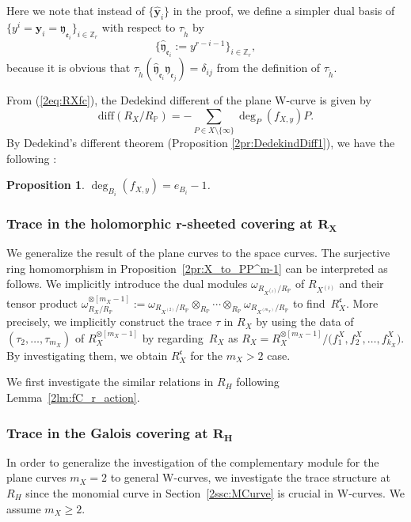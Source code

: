 \documentclass[pdftex]{sigma}
\def\ZZ{{\mathbb Z}}
\def\PP{{\mathbb P}}
\def\bby{{\mathbf y}}
\def\fc{{\mathfrak c}}
\def\fe{{\mathfrak e}}
\def\fy{{\mathfrak y}}
\def\th{{\widetilde h}}
\def\hfy{{\widehat{\mathfrak y}}}
\def\hby{\widehat {{\mathbf y}}}
\def\diff{\mathrm{diff}}
\numberwithin{equation}{section}
\newtheorem{Proposition}[Theorem]{Proposition}
 { \theoremstyle{definition}
\newtheorem{Definition}[Theorem]{Definition}
\newtheorem{Note}[Theorem]{Note}
\newtheorem{Example}[Theorem]{Example}
\newtheorem{Remark}[Theorem]{Remark} }
\begin{document}
\begin{Remark}\label{2rmk:hetam=2}
Here we note that instead of $\{\hby_i\}$ in the proof, we define a simpler dual basis of $\{y^i =\bby_i = \fy_{\fe_i}\}_{i\in \ZZ_r}$ with respect to $\tau_\th$ by
\[
\big\{\hfy_{\fe_i}:=y^{r-i-1}\big\}_{i \in \ZZ_r},
\]
because it is obvious that
$\tau_\th(\hfy_{\fe_i}\fy_{\fe_j})=\delta_{ij}$ from the definition of $\tau_\th$.
\end{Remark}

From (\ref{2eq:RXfc}), the Dedekind different of the plane W-curve is given by
\[
\diff(R_X/R_\PP)=-\sum_{P\in X\setminus\{\infty\}}\deg_P(f_{X,y}) P.
\]
By Dedekind's different theorem (Proposition \ref{2pr:DedekindDiff1}), we have the following \cite[Chapter 15]{Kunz2004}:
\begin{Proposition}\label{2pr:DedekindDiff2}
$\deg_{B_i}(f_{X,y})=e_{B_i}-1$.
\end{Proposition}

\subsubsection[Trace in the holomorphic r-sheeted covering at R\_X]{Trace in the holomorphic $\boldsymbol{r}$-sheeted covering at $\boldsymbol{R_X}$}\label{2sec:Trace_RX1}

We generalize the result of the plane curves to the space curves.
The surjective ring homomorphism in Proposition~\ref{2pr:X_to_PP^m-1} can be interpreted as follows.
We implicitly introduce the dual modules $\omega_{R_{X^{(i)}}/R_\PP}$ of $R_{X^{(i)}}$ and their tensor product $\omega_{R_X/R_\PP}^{\otimes[m_X-1]}:=\omega_{R_{X^{(2)}}/R_\PP}\otimes_{R_\PP}\cdots\otimes_{R_\PP}\omega_{R_{X^{(m_X)}}/R_\PP}$ to find~$R_X^\fc$.
More precisely, we implicitly construct the trace $\tau$ in $R_X$ by using the data of $(\tau_2, \dots, \tau_{m_X})$ of $R_X^{\otimes[m_X-1]}$ by regarding~$R_X$ as $R_X=R_X^{\otimes[m_X-1]}/\big(f^X_1, f^X_2, \dots, f^X_{k_X}\big)$.
By investigating them, we obtain $R_X^\fc$ for the $m_X>2$ case.

We first investigate the similar relations in $R_{H}$ following Lemma~\ref{2lm:fC_r_action}.

\subsubsection[Trace in the Galois covering at R\_H]{Trace in the Galois covering at $\boldsymbol{R_{H}}$}\label{2sec:Trace_RH}

In order to generalize the investigation of the complementary module for the plane curves $m_X=2$ to general W-curves, we investigate the trace structure at $R_{H}$ since the monomial curve in Section~\ref{2ssc:MCurve} is crucial in W-curves.
We assume $m_X\ge 2$.
\end{document}
